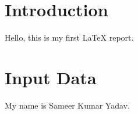 \documentclass{article}
\begin{document}
\section{Introduction}
Hello, this is my first LaTeX report.

\section{Input Data}
My name is Sameer Kumar Yadav.
\end{document}
